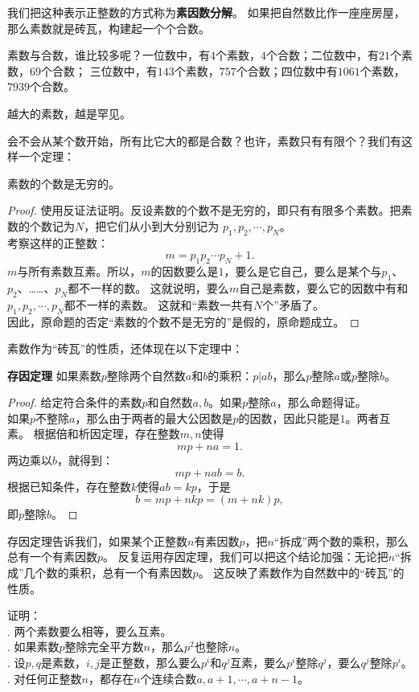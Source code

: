 \documentclass[12pt,UTF8]{ctexbook}
\begin{document}
我们把这种表示正整数的方式称为\textbf{素因数分解}。
如果把自然数比作一座座房屋，那么素数就是砖瓦，构建起一个个合数。

素数与合数，谁比较多呢？一位数中，有$4$个素数，$4$个合数；二位数中，有$21$个素数，$69$个合数；
三位数中，有$143$个素数，$757$个合数；四位数中有$1061$个素数，$7939$个合数。

越大的素数，越是罕见。

会不会从某个数开始，所有比它大的都是合数？也许，素数只有有限个？我们有这样一个定理：

\begin{tm}\label{tm:1-0-10}
    素数的个数是无穷的。
\end{tm}
\begin{proof}
    使用反证法证明。反设素数的个数不是无穷的，即只有有限多个素数。把素数的个数记为$N$，把它们从小到大分别记为
    $p_1, p_2,\cdots , p_N$。\\
    考察这样的正整数：
    $$ m = p_1p_2\cdots p_N + 1.$$
    $m$与所有素数互素。所以，$m$的因数要么是$1$，要么是它自己，要么是某个与$p_1$、$p_2$、……、$p_N$都不一样的数。
    这就说明，要么$m$自己是素数，要么它的因数中有和$p_1, p_2,\cdots , p_N$都不一样的素数。
    这就和“素数一共有$N$个”矛盾了。\\
    因此，原命题的否定“素数的个数不是无穷的”是假的，原命题成立。
\end{proof}

素数作为“砖瓦”的性质，还体现在以下定理中：
\begin{tm}{\textbf{存因定理 }}\label{tm:1-0-20}
    如果素数$p$整除两个自然数$a$和$b$的乘积：$p | ab$，那么$p$整除$a$或$p$整除$b$。
\end{tm}
\begin{proof}
    给定符合条件的素数$p$和自然数$a,b$。如果$p$整除$a$，那么命题得证。\\
    如果$p$不整除$a$，那么由于两者的最大公因数是$p$的因数，因此只能是$1$。两者互素。
    根据倍和析因定理，存在整数$m,n$使得
    $$ mp + na = 1.$$
    两边乘以$b$，就得到：
    $$ mp + nab = b. $$
    根据已知条件，存在整数$k$使得$ab = kp$，于是 
    $$ b = mp + nkp = (m + nk)p,$$
    即$p$整除$b$。
\end{proof}

存因定理告诉我们，如果某个正整数$n$有素因数$p$，把$n$“拆成”两个数的乘积，那么总有一个有素因数$p$。
反复运用存因定理，我们可以把这个结论加强：无论把$n$“拆成”几个数的乘积，总有一个有素因数$p$。
这反映了素数作为自然数中的“砖瓦”的性质。

\begin{xt}\label{xt:1-0-0}
    证明：\\
    . 两个素数要么相等，要么互素。\\
    . 如果素数$p$整除完全平方数$n$，那么$p^2$也整除$n$。\\
    . 设$p,q$是素数，$i,j$是正整数，那么要么$p^i$和$q^j$互素，要么$p^i$整除$q^j$，要么$q^j$整除$p^i$。\\
    . 对任何正整数$n$，都存在$n$个连续合数$a, a+1, \cdots , a+n-1$。
\end{xt}
\end{document}
